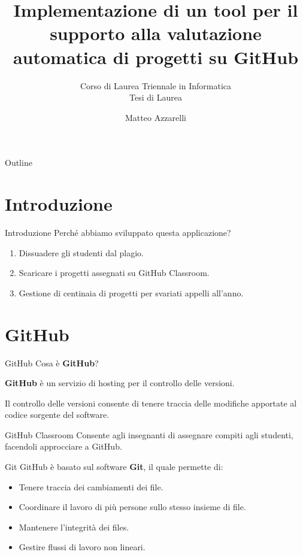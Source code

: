 \documentclass{beamer}
\title{Implementazione di un tool per il supporto alla valutazione automatica di progetti su GitHub}
\subtitle{\vspace{-0cm}Corso di Laurea Triennale in Informatica\\{\large Tesi di Laurea}}
\author{%
	Matteo Azzarelli}
\date{\vspace{2.5cm}\color{black}{\footnotesize{ANNO ACCADEMICO 2017/2018}}}
\begin{document}
	\maketitle

	\begin{frame}{Outline}
		\tableofcontents
	\end{frame}

	\section{Introduzione}
	
	\begin{frame}{Introduzione}
		Perché abbiamo sviluppato questa applicazione?
		\pause
		\begin{enumerate}[<+->]
			\item Dissuadere gli studenti dal plagio.
			\item Scaricare i progetti assegnati su GitHub Classroom.
			\item Gestione di centinaia di progetti per svariati appelli all'anno.
		\end{enumerate}
	\end{frame}

	\section{GitHub}
	
	\begin{frame}{GitHub}
		Cosa è \textbf{GitHub}?
		
		\vspace{0.5cm}
		\textbf{GitHub} è un servizio di hosting per il controllo delle versioni. 
		
		\vspace{0.5cm}
		Il controllo delle versioni consente di tenere traccia delle modifiche apportate al codice sorgente del software.
		\pause
		
		\begin{alertblock}{GitHub Classroom}
			Consente agli insegnanti di assegnare compiti agli studenti, facendoli approcciare a GitHub.
		\end{alertblock}
	\end{frame}
	

	\begin{frame}{Git}
		GitHub è basato sul software \textbf{Git}, il quale permette di:
		\begin{itemize}[<+->]
			\item Tenere traccia dei cambiamenti dei file.
			\item Coordinare il lavoro di più persone sullo stesso insieme di file.
			\item Mantenere l'integrità dei files.
			\item Gestire flussi di lavoro non lineari.
		\end{itemize}
	\end{frame}
	
\end{document}
